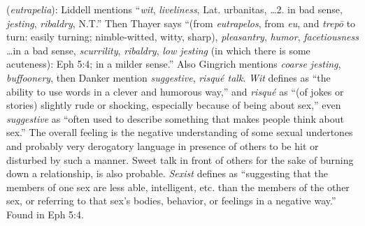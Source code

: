 \item[Sex-slander,]

(\textit{eutrapelia}):
Liddell mentions ``\emph{wit}, \emph{liveliness}, Lat. urbanitas, \ldots 2. in bad sense, \emph{jesting}, \emph{ribaldry}, N.T.'' Then Thayer says ``(from \emph{eutrapelos}, from \emph{eu}, and \emph{trepō} to turn: easily turning; nimble-witted, witty, sharp), \emph{pleasantry}, \emph{humor}, \emph{facetiousness} \ldots in a bad sense, \emph{scurrility}, \emph{ribaldry}, \emph{low jesting} (in which there is some acuteness): Eph 5:4; in a milder sense.'' Also Gingrich mentions \emph{coarse jesting}, \emph{buffoonery}, then Danker mention \emph{suggestive}, \emph{risqué talk}. \emph{Wit} defines as ``the ability to use words in a clever and humorous way,'' and \emph{risqué} as ``(of jokes or stories) slightly rude or shocking, especially because of being about sex,'' even \emph{suggestive} as ``often used to describe something that makes people think about sex.'' The overall feeling is the negative understanding of some sexual undertones and probably very derogatory language in presence of others to be hit or disturbed by such a manner. Sweet talk in front of others for the sake of burning down a relationship, is also probable. \emph{Sexist} defines as ``suggesting that the members of one sex are less able, intelligent, etc. than the members of the other sex, or referring to that sex's bodies, behavior, or feelings in a negative way.''
Found in Eph 5:4.
